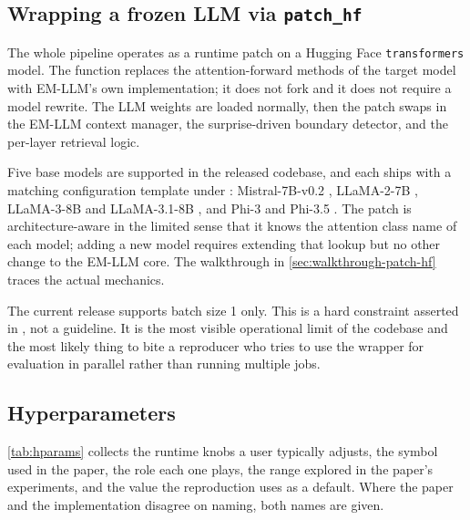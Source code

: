 \subsection{Wrapping a frozen LLM via \texttt{patch\_hf}}
\label{sec:patch-hf}

The whole pipeline operates as a runtime patch on a Hugging Face \texttt{transformers} model. The function  replaces the attention-forward methods of the target model with EM-LLM's own implementation; it does not fork  and it does not require a model rewrite. The LLM weights are loaded normally, then the patch swaps in the EM-LLM context manager, the surprise-driven boundary detector, and the per-layer retrieval logic.

Five base models are supported in the released codebase, and each ships with a matching configuration template under : Mistral-7B-v0.2 \cite{jiang2023mistral}, LLaMA-2-7B \cite{touvron2023llama2}, LLaMA-3-8B and LLaMA-3.1-8B \cite{meta2024llama3}, and Phi-3 and Phi-3.5 \cite{abdin2024phi3}. The patch is architecture-aware in the limited sense that it knows the attention class name of each model; adding a new model requires extending that lookup but no other change to the EM-LLM core. The walkthrough in \cref{sec:walkthrough-patch-hf} traces the actual mechanics.

The current release supports batch size 1 only. This is a hard constraint asserted in , not a guideline. It is the most visible operational limit of the codebase and the most likely thing to bite a reproducer who tries to use the wrapper for evaluation in parallel rather than running multiple jobs.

\subsection{Hyperparameters}
\label{sec:hparams}

\cref{tab:hparams} collects the runtime knobs a user typically adjusts, the symbol used in the paper, the role each one plays, the range explored in the paper's experiments, and the value the reproduction uses as a default. Where the paper and the implementation disagree on naming, both names are given.


